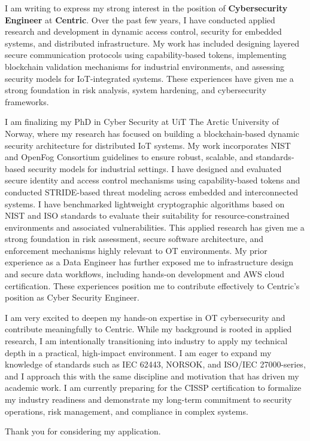 

I am writing to express my strong interest in the position of \textbf{Cybersecurity Engineer} at \textbf{Centric}. Over the past few years, I have conducted applied research and development in dynamic access control, security for embedded systems, and distributed infrastructure. My work has included designing layered secure communication protocols using capability-based tokens, implementing blockchain validation mechanisms for industrial environments, and assessing security models for IoT-integrated systems. These experiences have given me a strong foundation in risk analysis, system hardening, and cybersecurity frameworks. 

 

I am finalizing my PhD in Cyber Security at UiT The Arctic University of Norway, where my research has focused on building a blockchain-based dynamic security architecture for distributed IoT systems. My work incorporates NIST and OpenFog Consortium guidelines to ensure robust, scalable, and standards-based security models for industrial settings. I have designed and evaluated secure identity and access control mechanisms using capability-based tokens and conducted STRIDE-based threat modeling across embedded and interconnected systems. I have benchmarked lightweight cryptographic algorithms based on NIST and ISO standards to evaluate their suitability for resource-constrained environments and associated vulnerabilities. This applied research has given me a strong foundation in risk assessment, secure software architecture, and enforcement mechanisms highly relevant to OT environments. My prior experience as a Data Engineer has further exposed me to infrastructure design and secure data workflows, including hands-on development and AWS cloud certification. These experiences position me to contribute effectively to Centric’s position as Cyber Security Engineer.

I am very excited to deepen my hands-on expertise in OT cybersecurity and contribute meaningfully to Centric. While my background is rooted in applied research, I am intentionally transitioning into industry to apply my technical depth in a practical, high-impact environment. I am eager to expand my knowledge of standards such as IEC 62443, NORSOK, and ISO/IEC 27000-series, and I approach this with the same discipline and motivation that has driven my academic work. I am currently preparing for the CISSP certification to formalize my industry readiness and demonstrate my long-term commitment to security operations, risk management, and compliance in complex systems.






Thank you for considering my application.
